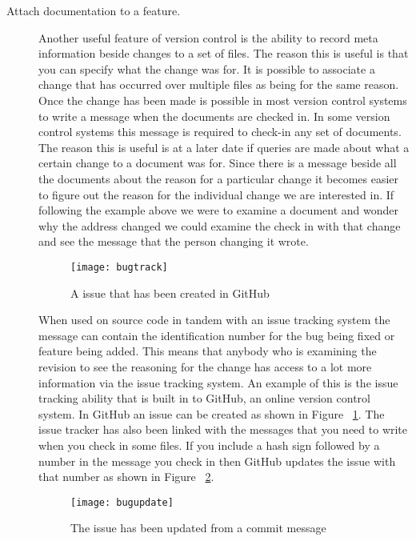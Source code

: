 \begin{description}
  \item [Attach documentation to a feature.]
  Another useful feature of version control is the ability to record meta information beside changes to a set of files.  The reason this is useful is that you can specify what the change was for.  It is possible to associate a change that has occurred over multiple files as being for the same reason.  Once the change has been made is possible in most version control systems to write a message when the documents are checked in.  In some version control systems this message is required to check-in any set of documents.  The reason this is useful is at a later date if queries are made about what a certain change to a document was for.  Since there is a message beside all the documents about the reason for a particular change it becomes easier to figure out the reason for the individual change we are interested in. If following the example above we were to examine a document and wonder why the address changed we could examine the check in with that change and see the message that the person changing it wrote.

  \begin{figure}[!t]
   \begin{center}
    \texttt{[image: bugtrack]}
   \end{center}
   \caption{A issue that has been created in GitHub}
   \label{fig:bgBugTrack}
  \end{figure}

  When used on source code in tandem with an issue tracking system the message can contain the identification number for the bug being fixed or feature being added.  This means that anybody who is examining the revision to see the reasoning for the change has access to a lot more information via the issue tracking system. An example of this is the issue tracking ability that is built in to GitHub, an online version control system. In GitHub an issue can be created as shown in Figure ~\ref{fig:bgBugTrack}. The issue tracker has also been linked with the messages that you need to write when you check in some files. If you include a hash sign followed by a number in the message you check in then GitHub updates the issue with that number as shown in Figure ~\ref{fig:bgBugUpdate}.

  \begin{figure}[!t]
   \begin{center}
    \texttt{[image: bugupdate]}
   \end{center}
   \caption{The issue has been updated from a commit message}
   \label{fig:bgBugUpdate}
  \end{figure}


\end{description}
